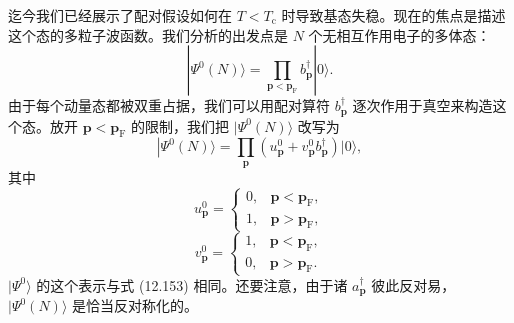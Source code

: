迄今我们已经展示了配对假设如何在 $T<T_{\mathrm c}$ 时导致基态失稳。现在的焦点是描述这个态的多粒子波函数。我们分析的出发点是 $N$ 个无相互作用电子的多体态：
\begin{equation*}
|\Psi^0(N)\rangle=\prod_{\mathbf p<\mathbf p_{\mathrm F}}b^\dagger_{\mathbf p}|0\rangle. \tag{12.153}
\end{equation*}
由于每个动量态都被双重占据，我们可以用配对算符 $b^\dagger_{\mathbf p}$ 逐次作用于真空来构造这个态。放开 $\mathbf p<\mathbf p_{\mathrm F}$ 的限制，我们把 $|\Psi^0(N)\rangle$ 改写为
\begin{equation*}
\left|\Psi^0\left(N\right)\right.\rangle=\prod_{\mathbf p}\left(u^0_{\mathbf p}+v^0_{\mathbf p}b^\dagger_{\mathbf p}\right)\left|0\right.\rangle, \tag{12.154}
\end{equation*}
其中
\begin{equation*}
u^0_{\mathbf p}=\begin{cases}0, & \mathbf p<\mathbf p_{\mathrm F},\\ 1, & \mathbf p>\mathbf p_{\mathrm F},\end{cases} \tag{12.155}
\end{equation*}
\begin{equation*}
v^0_{\mathbf p}=\begin{cases}1, & \mathbf p<\mathbf p_{\mathrm F},\\ 0, & \mathbf p>\mathbf p_{\mathrm F}.\end{cases} \tag{12.156}
\end{equation*}
$|\Psi^0\rangle$ 的这个表示与式 (12.153) 相同。还要注意，由于诸 $a^\dagger_{\mathbf p}$ 彼此反对易，$|\Psi^0(N)\rangle$ 是恰当反对称化的。

